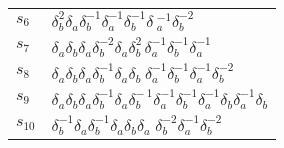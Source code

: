 \documentclass{article}
\begin{document}
\begin{center}
\begin{tabular}{ll}
$s_{6}$ & $\delta_b^{2}\delta_a^{}\delta_b^{-1}\delta_a^{-1}\delta_b^{-1}\delta\
_a^{-1}\delta_b^{-2}$ \\
$s_{7}$ & $\delta_a^{}\delta_b^{}\delta_a^{}\delta_b^{-2}\delta_a^{}\delta_b^{2\
}\delta_a^{-1}\delta_b^{-1}\delta_a^{-1}$ \\
$s_{8}$ & $\delta_a^{}\delta_b^{}\delta_a^{}\delta_b^{-1}\delta_a^{}\delta_b^{}\
\delta_a^{-1}\delta_b^{-1}\delta_a^{-1}\delta_b^{-2}$ \\
$s_{9}$ & $\delta_a^{}\delta_b^{}\delta_a^{}\delta_b^{-1}\delta_a^{}\delta_b^{-\
1}\delta_a^{-1}\delta_b^{-1}\delta_a^{-1}\delta_b^{}\delta_a^{-1}\delta_b^{}$ \\
$s_{10}$ & $\delta_b^{-1}\delta_a^{}\delta_b^{-1}\delta_a^{}\delta_b^{}\delta_a\
^{}\delta_b^{-2}\delta_a^{-1}\delta_b^{-2}$ \\
\bottomrule
\end{tabular}
\end{center}

\thispagestyle{empty}
\end{document}
